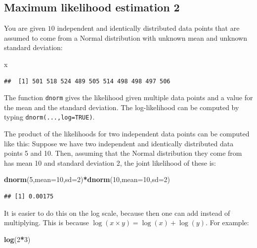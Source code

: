 \documentclass[12pt,]{krantz}
\newenvironment{Shaded}{\begin{snugshade}}{\end{snugshade}}
\newcommand{\DataTypeTok}[1]{\textcolor[rgb]{0.13,0.29,0.53}{#1}}
\newcommand{\DecValTok}[1]{\textcolor[rgb]{0.00,0.00,0.81}{#1}}
\newcommand{\KeywordTok}[1]{\textcolor[rgb]{0.13,0.29,0.53}{\textbf{#1}}}
\newcommand{\NormalTok}[1]{#1}
\newcommand{\OperatorTok}[1]{\textcolor[rgb]{0.81,0.36,0.00}{\textbf{#1}}}
\theoremstyle{definition}
\theoremstyle{definition}
\theoremstyle{definition}
\theoremstyle{remark}
\begin{document}
\hypertarget{maximum-likelihood-estimation-2}{%
\subsection{Maximum likelihood estimation 2}\label{maximum-likelihood-estimation-2}}

You are given \(10\) independent and identically distributed data points that are assumed to come from a Normal distribution with unknown mean and unknown standard deviation:

\begin{Shaded}
\begin{Highlighting}[]
\NormalTok{x}
\end{Highlighting}
\end{Shaded}

\begin{verbatim}
##  [1] 501 518 524 489 505 514 498 498 497 506
\end{verbatim}

The function \texttt{dnorm} gives the likelihood given multiple data points and a value for the mean and the standard deviation. The log-likelihood can be computed by typing \texttt{dnorm(...,log=TRUE)}.

The product of the likelihoods for two independent data points can be computed like this: Suppose we have two independent and identically distributed data points 5 and 10. Then, assuming that the Normal distribution they come from has mean 10 and standard deviation 2, the joint likelihood of these is:

\begin{Shaded}
\begin{Highlighting}[]
\KeywordTok{dnorm}\NormalTok{(}\DecValTok{5}\NormalTok{,}\DataTypeTok{mean=}\DecValTok{10}\NormalTok{,}\DataTypeTok{sd=}\DecValTok{2}\NormalTok{)}\OperatorTok{*}\KeywordTok{dnorm}\NormalTok{(}\DecValTok{10}\NormalTok{,}\DataTypeTok{mean=}\DecValTok{10}\NormalTok{,}\DataTypeTok{sd=}\DecValTok{2}\NormalTok{)}
\end{Highlighting}
\end{Shaded}

\begin{verbatim}
## [1] 0.00175
\end{verbatim}

It is easier to do this on the log scale, because then one can add instead of multiplying. This is because \(\log(x\times y)= \log(x) + \log(y)\). For example:

\begin{Shaded}
\begin{Highlighting}[]
\KeywordTok{log}\NormalTok{(}\DecValTok{2}\OperatorTok{*}\DecValTok{3}\NormalTok{)}
\end{Highlighting}
\end{Shaded}
\end{document}

